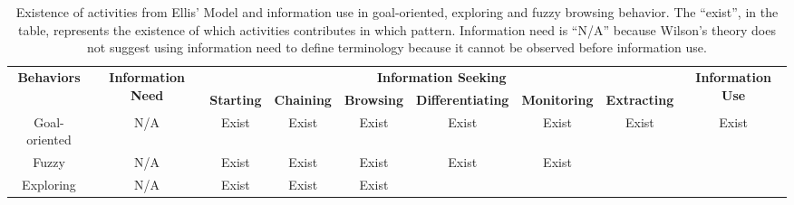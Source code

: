 \begin{table}[H]
    \small
    \centering
    \caption{Existence of activities from Ellis' Model and information use in 
    goal-oriented, exploring and fuzzy browsing behavior.
    The ``exist'', in the table, represents the existence of which activities contributes in which pattern.
    Information need is ``N/A'' because Wilson's theory does not suggest using information need to
    define terminology because it cannot be observed before information use.
    }
    \begin{adjustbox}{width=\textwidth}
        \begin{tabular}{ccccccccc}
            \toprule
            \multicolumn{1}{c}{\multirow{2}{*}{\textbf{Behaviors}}}  & \multicolumn{1}{c}{\multirow{2}{*}{\textbf{Information Need}}} & \multicolumn{6}{c}{\textbf{Information Seeking}}                                    & \multicolumn{1}{c}{\multirow{2}{*}{\textbf{Information Use}}} \\ \cline{3-8}
            \multicolumn{1}{c}{}                                     & \multicolumn{1}{c}{}                                  & \textbf{Starting} & \textbf{Chaining} & \textbf{Browsing} & \textbf{Differentiating} & \textbf{Monitoring} & \textbf{Extracting} & \multicolumn{1}{c}{}  \\
            \hline
            Goal-oriented                                            &   N/A                                                 &     Exist         &      Exist        &   Exist           &        Exist               &       Exist           &        Exist          &      Exist              \\
            Fuzzy                                                &   N/A                                                 &     Exist         &      Exist        &   Exist           &        Exist               &       Exist           &                     &                       \\
            Exploring                                                    &   N/A                                                 &     Exist         &      Exist        &   Exist           &                          &                     &                     &                       \\
            \bottomrule
        \end{tabular}
        \label{table:ellis}
    \end{adjustbox}
\end{table}

